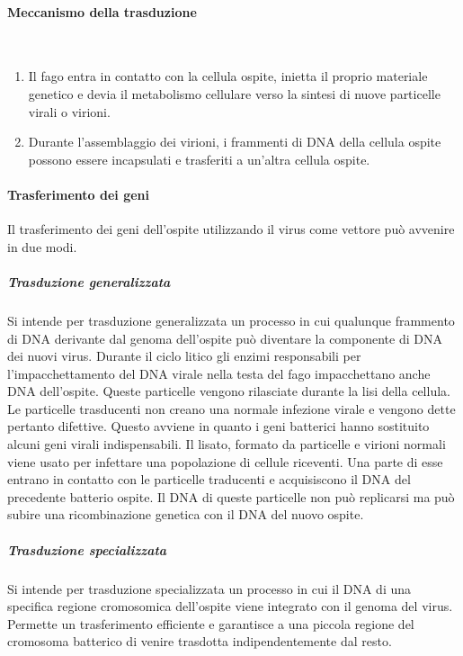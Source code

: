 			\paragraph{Meccanismo della trasduzione}\mbox{}\\
			\begin{multicols}{2}
				\begin{enumerate}
		    			\item Il fago entra in contatto con la cellula ospite, inietta il proprio materiale genetico e devia il metabolismo cellulare verso la sintesi di nuove particelle virali o virioni. 
    					\item Durante l'assemblaggio dei virioni, i frammenti di DNA della cellula ospite possono essere incapsulati e trasferiti a un'altra cellula ospite.
				\end{enumerate}
			\end{multicols}

			\paragraph{Trasferimento dei geni}
			Il trasferimento dei geni dell'ospite utilizzando il virus come vettore pu\`o avvenire in due modi.

				\subparagraph{Trasduzione generalizzata}
				Si intende per trasduzione generalizzata un processo in cui qualunque frammento di DNA derivante dal genoma dell'ospite pu\`o diventare la componente di DNA dei nuovi virus.
				Durante il ciclo litico gli enzimi responsabili per l'impacchettamento del DNA virale nella testa del fago impacchettano anche DNA dell'ospite.
				Queste particelle vengono rilasciate durante la lisi della cellula.
				Le particelle trasducenti non creano una normale infezione virale e vengono dette pertanto difettive.
				Questo avviene in quanto i geni batterici hanno sostituito alcuni geni virali indispensabili.
				Il lisato, formato da particelle e virioni normali viene usato per infettare una popolazione di cellule riceventi.
				Una parte di esse entrano in contatto con le particelle traducenti e acquisiscono il DNA del precedente batterio ospite.
				Il DNA di queste particelle non pu\`o replicarsi ma pu\`o subire una ricombinazione genetica con il DNA del nuovo ospite.

				\subparagraph{Trasduzione specializzata}
				Si intende per trasduzione specializzata un processo in cui il DNA di una specifica regione cromosomica dell'ospite viene integrato con il genoma del virus.
				Permette un trasferimento efficiente e garantisce a una piccola regione del cromosoma batterico di venire trasdotta indipendentemente dal resto.
    
